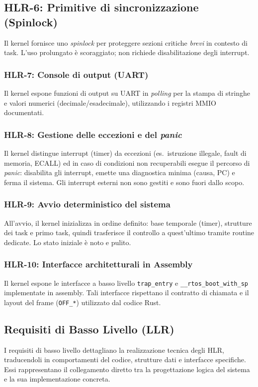\documentclass[italian, Lau, oneside]{sapthesis} %
\begin{document}
\subsection*{HLR-6: Primitive di sincronizzazione (Spinlock)}
Il kernel fornisce uno \emph{spinlock} per proteggere sezioni critiche \emph{brevi} in contesto di task. L’uso prolungato è scoraggiato; non richiede disabilitazione degli interrupt.

\subsubsection*{HLR-7: Console di output (UART)}
Il kernel espone funzioni di output su UART in \emph{polling} per la stampa di stringhe e valori numerici (decimale/esadecimale), utilizzando i registri MMIO documentati.

\subsubsection*{HLR-8: Gestione delle eccezioni e del \textit{panic}}
Il kernel distingue interrupt (timer) da eccezioni (es.\ istruzione illegale, fault di memoria, ECALL) ed in caso di condizioni non recuperabili esegue il percorso di \emph{panic}: disabilita gli interrupt, emette una diagnostica minima (causa, PC) e ferma il sistema. Gli interrupt esterni non sono gestiti e sono fuori dallo scopo.

\subsubsection*{HLR-9: Avvio deterministico del sistema}
All’avvio, il kernel inizializza in ordine definito: base temporale (timer), strutture dei task e primo task, quindi trasferisce il controllo a quest’ultimo tramite routine dedicate. Lo stato iniziale è noto e pulito.

\subsubsection*{HLR-10: Interfacce architetturali in Assembly}
Il kernel espone le interfacce a basso livello \texttt{trap\_entry} e \texttt{\_\_rtos\_boot\_with\_sp} implementate in assembly. Tali interfacce rispettano il contratto di chiamata e il layout del frame (\texttt{OFF\_*}) utilizzato dal codice Rust.

\subsection{Requisiti di Basso Livello (LLR)}
I requisiti di basso livello dettagliano la realizzazione tecnica degli HLR, traducendoli in comportamenti del codice, strutture dati e interfacce specifiche.  
Essi rappresentano il collegamento diretto tra la progettazione logica del sistema e la sua implementazione concreta.
\end{document}
